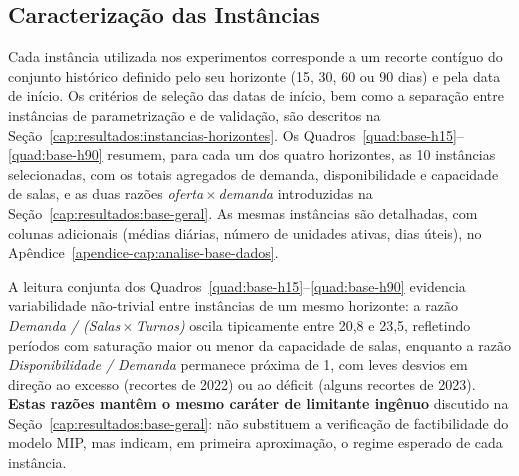 \subsection{Caracterização das Instâncias}
\label{cap:resultados:base-instancias}

Cada instância utilizada nos experimentos corresponde a um recorte contíguo do conjunto histórico definido pelo seu horizonte (15, 30, 60 ou 90 dias) e pela data de início. Os critérios de seleção das datas de início, bem como a separação entre instâncias de parametrização e de validação, são descritos na Seção~\ref{cap:resultados:instancias-horizontes}. Os Quadros~\ref{quad:base-h15}--\ref{quad:base-h90} resumem, para cada um dos quatro horizontes, as 10 instâncias selecionadas, com os totais agregados de demanda, disponibilidade e capacidade de salas, e as duas razões \emph{oferta\,$\times$\,demanda} introduzidas na Seção~\ref{cap:resultados:base-geral}. As mesmas instâncias são detalhadas, com colunas adicionais (médias diárias, número de unidades ativas, dias úteis), no Apêndice~\ref{apendice-cap:analise-base-dados}.

A leitura conjunta dos Quadros~\ref{quad:base-h15}--\ref{quad:base-h90} evidencia variabilidade não-trivial entre instâncias de um mesmo horizonte: a razão \emph{Demanda / (Salas\,$\times$\,Turnos)} oscila tipicamente entre 20{,}8 e 23{,}5, refletindo períodos com saturação maior ou menor da capacidade de salas, enquanto a razão \emph{Disponibilidade / Demanda} permanece próxima de 1, com leves desvios em direção ao excesso (recortes de 2022) ou ao déficit (alguns recortes de 2023). \textbf{Estas razões mantêm o mesmo caráter de limitante ingênuo} discutido na Seção~\ref{cap:resultados:base-geral}: não substituem a verificação de factibilidade do modelo MIP, mas indicam, em primeira aproximação, o regime esperado de cada instância.

\begin{quadro}[h]
	\centering
	\caption{Caracterização agregada das 10 instâncias do horizonte de 15 dias.}
	\resizebox{0.8\textwidth}{!}{\begin{minipage}{\textwidth}
			
		\end{minipage}}
	\label{quad:base-h15}
	\fautor
\end{quadro}

\begin{quadro}[h]
	\centering
	\caption{Caracterização agregada das 10 instâncias do horizonte de 30 dias.}
	\resizebox{0.8\textwidth}{!}{\begin{minipage}{\textwidth}
			
		\end{minipage}}
	\label{quad:base-h30}
	\fautor
\end{quadro}


